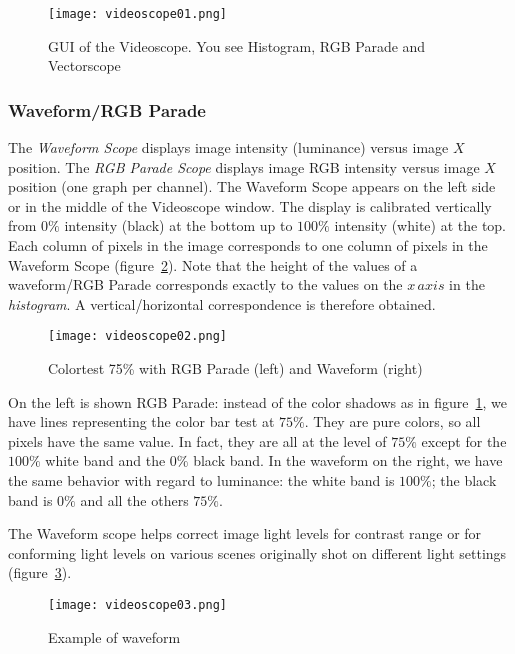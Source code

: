 \begin{figure}[hbtp]
    \centering
    \texttt{[image: videoscope01.png]}
    \caption{GUI of the Videoscope. You see Histogram, RGB Parade and Vectorscope}
    \label{fig:videoscope01}
\end{figure}

\subsubsection*{Waveform/RGB Parade}%
\label{ssub:waveform_rgb_parade}

The \textit{Waveform Scope} displays image intensity (luminance) versus image $X$ position. The \textit{RGB Parade Scope} displays image RGB intensity versus image $X$ position (one graph per channel). The Waveform Scope appears on the left side or in the middle of the Videoscope window. The display is calibrated vertically from $0\%$ intensity (black) at the bottom up to $100\%$ intensity (white) at the top. Each column of pixels in the image corresponds to one column of pixels in the Waveform Scope (figure~\ref{fig:videoscope02}). Note that the height of the values of a waveform/RGB Parade corresponds exactly to the values on the $x\, axis$ in the \textit{histogram}. A vertical/horizontal correspondence is therefore obtained.

\begin{figure}[hbtp]
    \centering
    \texttt{[image: videoscope02.png]}
    \caption{Colortest 75\% with RGB Parade (left) and Waveform (right)}
    \label{fig:videoscope02}
\end{figure}

On the left is shown RGB Parade: instead of the color shadows as in figure~\ref{fig:videoscope01}, we have lines representing the color bar test at $75\%$. They are pure colors, so all pixels have the same value. In fact, they are all at the level of $75\%$ except for the $100\%$ white band and the $0\%$ black band. In the waveform on the right, we have the same behavior with regard to luminance: the white band is $100\%$; the black band is $0\%$ and all the others $75\%$.

The Waveform scope helps correct image light levels for contrast range or for conforming light levels on various scenes originally shot on different light settings (figure~\ref{fig:videoscope03}).

\begin{figure}[hbtp]
    \centering
    \texttt{[image: videoscope03.png]}
    \caption{Example of waveform}
    \label{fig:videoscope03}
\end{figure}

